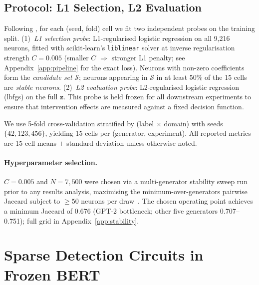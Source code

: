 \documentclass[11pt]{article}
\begin{document}
\subsection{Protocol: L1 Selection, L2 Evaluation}
\label{sec:setup-protocol}

Following \citet{gurnee2023haystack}, for each (seed, fold) cell we fit two independent probes on the training split. (1)~\textit{L1 selection probe}: L1-regularised logistic regression on all 9{,}216 neurons, fitted with scikit-learn's \texttt{liblinear} solver at inverse regularisation strength $C = 0.005$ (smaller $C$ $\Rightarrow$ stronger L1 penalty; see Appendix~\ref{app:pipeline} for the exact loss). Neurons with non-zero coefficients form the \textit{candidate set} $\mathcal{S}$; neurons appearing in $\mathcal{S}$ in at least 50\% of the 15 cells are \textit{stable neurons}. (2)~\textit{L2 evaluation probe}: L2-regularised logistic regression (lbfgs) on the full $\mathbf{z}$. This probe is held frozen for all downstream experiments to ensure that intervention effects are measured against a fixed decision function.

We use 5-fold cross-validation stratified by (label $\times$ domain) with seeds $\{42, 123, 456\}$, yielding 15 cells per (generator, experiment). All reported metrics are 15-cell means $\pm$ standard deviation unless otherwise noted.

\paragraph{Hyperparameter selection.}
\label{sec:setup-stability}%
$C = 0.005$ and $N = 7{,}500$ were chosen via a multi-generator stability sweep run prior to any results analysis, maximising the minimum-over-generators pairwise Jaccard subject to $\geq 50$ neurons per draw~\citep{gurnee2023haystack}. The chosen operating point achieves a minimum Jaccard of 0.676 (GPT-2 bottleneck; other five generators 0.707--0.751); full grid in Appendix~\ref{app:stability}.

\section{Sparse Detection Circuits in Frozen BERT}
\label{sec:results-sparse}
\end{document}

